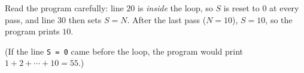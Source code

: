 Read the program carefully: line $20$ is \emph{inside} the loop, so $S$ is reset to $0$ at every pass, and line $30$ then sets $S=N$. After the last pass ($N=10$), $S=10$, so the program prints $\boxed{10}$.

(If the line \texttt{S = 0} came before the loop, the program would print $1+2+\cdots+10=55$.)
